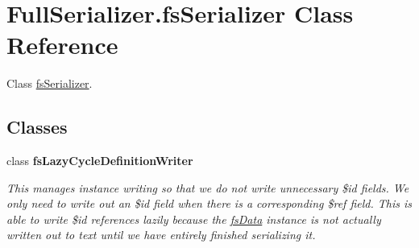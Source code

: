 \hypertarget{class_full_serializer_1_1fs_serializer}{}\section{Full\+Serializer.\+fs\+Serializer Class Reference}
\label{class_full_serializer_1_1fs_serializer}


Class \hyperlink{class_full_serializer_1_1fs_serializer}{fs\+Serializer}.  


\subsection*{Classes}
\begin{DoxyCompactItemize}
\item 
class {\bfseries fs\+Lazy\+Cycle\+Definition\+Writer}
\begin{DoxyCompactList}\small\item\em This manages instance writing so that we do not write unnecessary \$id fields. We only need to write out an \$id field when there is a corresponding \$ref field. This is able to write \$id references lazily because the \hyperlink{class_full_serializer_1_1fs_data}{fs\+Data} instance is not actually written out to text until we have entirely finished serializing it. \end{DoxyCompactList}\end{DoxyCompactItemize}
